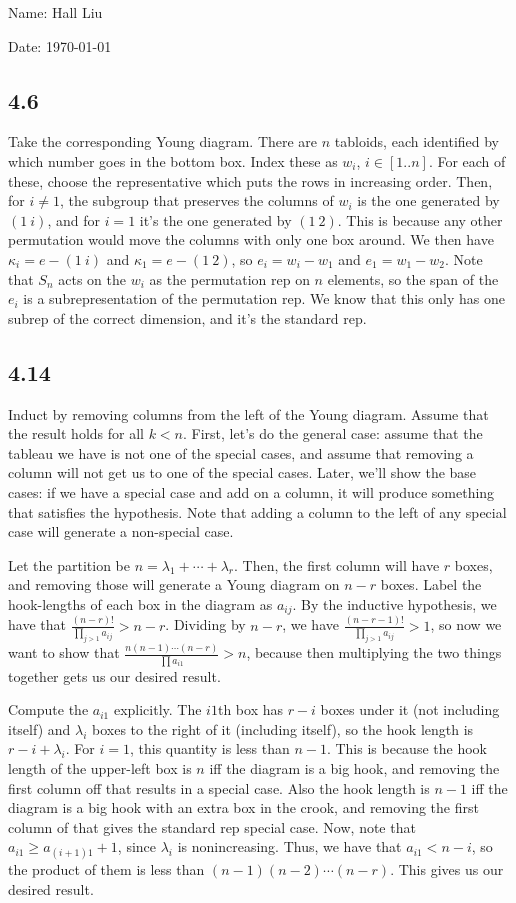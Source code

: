 \documentclass{article}
\begin{document}
Name: Hall Liu

Date: \today 
\vspace{1.5cm}

\subsection*{4.6}
Take the corresponding Young diagram. There are $n$ tabloids, each identified by which number goes in the bottom box. Index these as $w_i$, $i\in[1..n]$. For each of these, choose the representative which puts the rows in increasing order. Then, for $i\neq1$, the subgroup that preserves the columns of $w_i$ is the one generated by $(1\ i)$, and for $i=1$ it's the one generated by $(1\ 2)$. This is because any other permutation would move the columns with only one box around. We then have $\kappa_i=e-(1\ i)$ and $\kappa_1=e-(1\ 2)$, so $e_i=w_i-w_1$ and $e_1=w_1-w_2$. Note that $S_n$ acts on the $w_i$ as the permutation rep on $n$ elements, so the span of the $e_i$ is a subrepresentation of the permutation rep. We know that this only has one subrep of the correct dimension, and it's the standard rep.
\subsection*{4.14}
Induct by removing columns from the left of the Young diagram. Assume that the result holds for all $k<n$. First, let's do the general case: assume that the tableau we have is not one of the special cases, and assume that removing a column will not get us to one of the special cases. Later, we'll show the base cases: if we have a special case and add on a column, it will produce something that satisfies the hypothesis. Note that adding a column to the left of any special case will generate a non-special case.

Let the partition be $n=\lambda_1+\cdots+\lambda_r$. Then, the first column will have $r$ boxes, and removing those will generate a Young diagram on $n-r$ boxes. Label the hook-lengths of each box in the diagram as $a_{ij}$. By the inductive hypothesis, we have that $\frac{(n-r)!}{\prod_{j>1}a_{ij}}>n-r$.  Dividing by $n-r$, we have $\frac{(n-r-1)!}{\prod_{j>1}a_{ij}}>1$, so now we want to show that $\frac{n(n-1)\cdots(n-r)}{\prod a_{i1}}>n$, because then multiplying the two things together gets us our desired result.

Compute the $a_{i1}$ explicitly. The $i1$th box has $r-i$ boxes under it (not including itself) and $\lambda_i$ boxes to the right of it (including itself), so the hook length is $r-i+\lambda_i$. For $i=1$, this quantity is less than $n-1$. This is because the hook length of the upper-left box is $n$ iff the diagram is a big hook, and removing the first column off that results in a special case. Also the hook length is $n-1$ iff the diagram is a big hook with an extra box in the crook, and removing the first column of that gives the standard rep special case. Now, note that $a_{i1}\geq a_{(i+1)1}+1$, since $\lambda_i$ is nonincreasing. Thus, we have that $a_{i1}<n-i$, so the product of them is less than $(n-1)(n-2)\cdots(n-r)$. This gives us our desired result.
\end{document}
